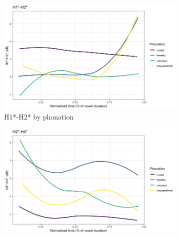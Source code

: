 \documentclass[12pt, letterpaper]{article}
\begin{document}

\begin{figure}
    \centering
    \begin{subfigure}{.5\textwidth}
		\centering
		\includegraphics[width=\linewidth]{Images/h1h2.png}
		\caption{H1*-H2* by phonation}
		\label{fig:H1H2}
	\end{subfigure}%
    \begin{subfigure}{.5\textwidth}
		\centering
		\includegraphics[width=\linewidth]{Images/h2h4.png}

\end{subfigure}
\end{figure}
\end{document}
